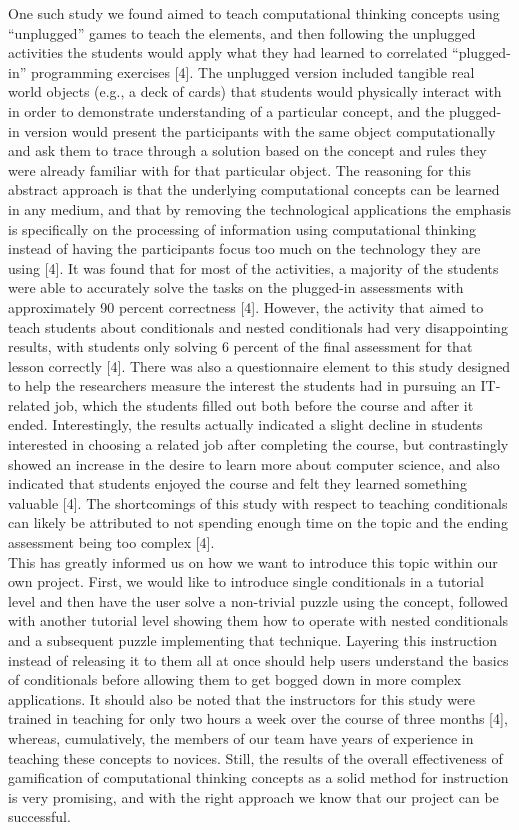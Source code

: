 One such study we found aimed to teach computational thinking concepts using 
“unplugged” games to teach the elements, and then following the unplugged activities 
the students would apply what they had learned to correlated “plugged-in” programming 
exercises [4]. The unplugged version included tangible real world objects (e.g., a deck 
of cards) that students would physically interact with in order to demonstrate understanding 
of a particular concept, and the plugged-in version would present the participants with 
the same object computationally and ask them to trace through a solution based on the 
concept and rules they were already familiar with for that particular object. The reasoning 
for this abstract approach is that the underlying computational concepts can be learned 
in any medium, and that by removing the technological applications the emphasis is 
specifically on the processing of information using computational thinking instead of 
having the participants focus too much on the technology they are using [4]. It was 
found that for most of the activities, a majority of the students were able to accurately 
solve the tasks on the plugged-in assessments with approximately 90 percent 
correctness [4]. However, the activity that aimed to teach students about conditionals 
and nested conditionals had very disappointing results, with students only solving 6 
percent of the final assessment for that lesson correctly [4]. There was also a 
questionnaire element to this study designed to help the researchers measure the 
interest the students had in pursuing an IT-related job, which the students filled out 
both before the course and after it ended. Interestingly, the results actually indicated 
a slight decline in students interested in choosing a related job after completing the 
course, but contrastingly showed an increase in the desire to learn more about 
computer science, and also indicated that students enjoyed the course and felt they 
learned something valuable [4]. The shortcomings of this study with respect to 
teaching conditionals can likely be attributed to not spending enough time on the 
topic and the ending assessment being too complex [4].\\

This has greatly informed us on how we want to introduce this topic within our 
own project. First, we would like to introduce single conditionals in a tutorial level 
and then have the user solve a non-trivial puzzle using the concept, followed with 
another tutorial level showing them how to operate with nested conditionals and a 
subsequent puzzle implementing that technique. Layering this instruction instead of 
releasing it to them all at once should help users understand the basics of conditionals 
before allowing them to get bogged down in more complex applications. It should 
also be noted that the instructors for this study were trained in teaching for only 
two hours a week over the course of three months [4], whereas, cumulatively, the 
members of our team have years of experience in teaching these concepts to novices. 
Still, the results of the overall effectiveness of gamification of computational thinking 
concepts as a solid method for instruction is very promising, and with the right approach 
we know that our project can be successful.\\